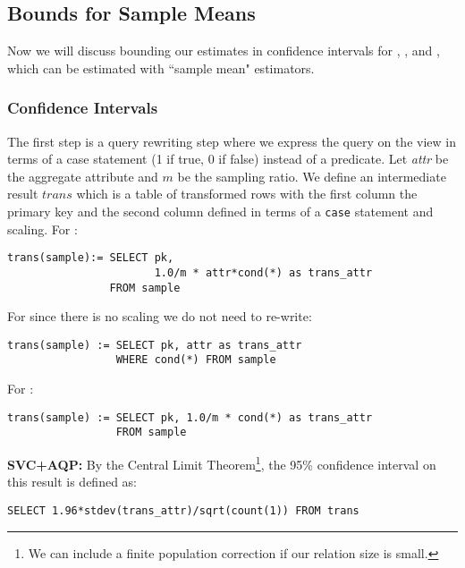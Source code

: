 \subsection{Bounds for Sample Means}
Now we will discuss bounding our estimates in confidence intervals for \sumfunc, \countfunc, and \avgfunc, which can be
estimated with ``sample mean" estimators.

\subsubsection{Confidence Intervals}
The first step is a query rewriting step where we express the query on the view in terms of a \textsf{case} statement (1 if true, 0 if false)
instead of a predicate.
Let \emph{attr} be the aggregate attribute and $m$ be the sampling ratio. 
We define an intermediate result $trans$ which is a table of transformed rows with the first column the 
primary key and the second column defined in terms of a \texttt{case} statement and scaling.
For \sumfunc:
\begin{lstlisting}[mathescape,basicstyle={\scriptsize}]
trans(sample):= SELECT pk, 
					   1.0/m * attr*cond(*) as trans_attr
				FROM sample
\end{lstlisting}
For \avgfunc since there is no scaling we do not need to re-write:
\begin{lstlisting}[mathescape,basicstyle={\scriptsize}]
trans(sample) := SELECT pk, attr as trans_attr 
				 WHERE cond(*) FROM sample
\end{lstlisting}
For \countfunc:
\begin{lstlisting}[mathescape,basicstyle={\scriptsize}]
trans(sample) := SELECT pk, 1.0/m * cond(*) as trans_attr
				 FROM sample
\end{lstlisting}

\vspace{0.25em}

\noindent\textbf{SVC+AQP: } By the Central Limit Theorem\footnote{We can include a finite population correction if our relation size is small.}, the 95\% confidence interval on this result is defined 
as:
\begin{lstlisting}[mathescape,basicstyle={\scriptsize}]
SELECT 1.96*stdev(trans_attr)/sqrt(count(1)) FROM trans
\end{lstlisting}

\vspace{0.25em}

